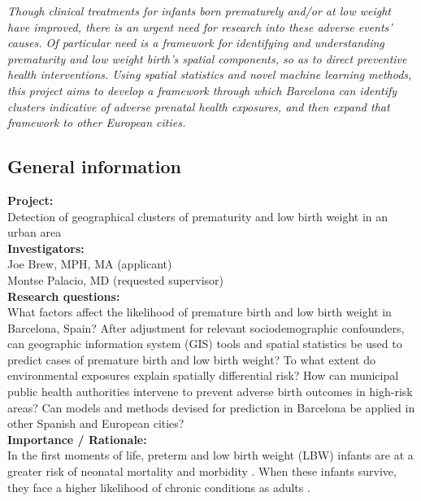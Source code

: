 \documentclass{article}
\begin{document}
\noindent \emph{Though clinical treatments for infants born prematurely and/or at low weight have improved, there is an urgent need for research into these adverse events' causes.  Of particular need is a framework for identifying and understanding prematurity and low weight birth's spatial components, so as to direct preventive health interventions.  Using spatial statistics and novel machine learning methods, this project aims to develop a framework through which Barcelona can identify clusters indicative of adverse prenatal health exposures, and then expand that framework to other European cities.} 


\newpage

\begin{multicols}{2}



\subsection*{General information}

\noindent \textbf{Project:}\\ Detection of geographical clusters of prematurity and low birth weight in an urban area \\

\noindent \textbf{Investigators:} \\ Joe Brew, MPH, MA (applicant) \\ Montse Palacio, MD (requested supervisor) \\


\noindent \textbf{Research questions:}\\ What factors affect the likelihood of premature birth and low birth weight in Barcelona, Spain?  After adjustment for relevant sociodemographic confounders, can geographic information system (GIS) tools and spatial statistics be used to predict cases of premature birth and low birth weight?  To what extent do environmental exposures explain spatially differential risk? How can municipal public health authorities intervene to prevent adverse birth outcomes in high-risk areas? Can models and methods devised for prediction in Barcelona be applied in other Spanish and European cities?    \\

\noindent \textbf{Importance / Rationale:}\\  In the first moments of life, preterm and low birth weight (LBW) infants are at a greater risk of neonatal mortality \cite{Tsai2014,Anderson2014} and morbidity \cite{Yeung2014,Merkestein2014}.   When these infants survive, they face a higher likelihood of chronic conditions as adults \cite{Visentin2014,Lane2014}.  \\ 


\end{multicols}
\end{document}
